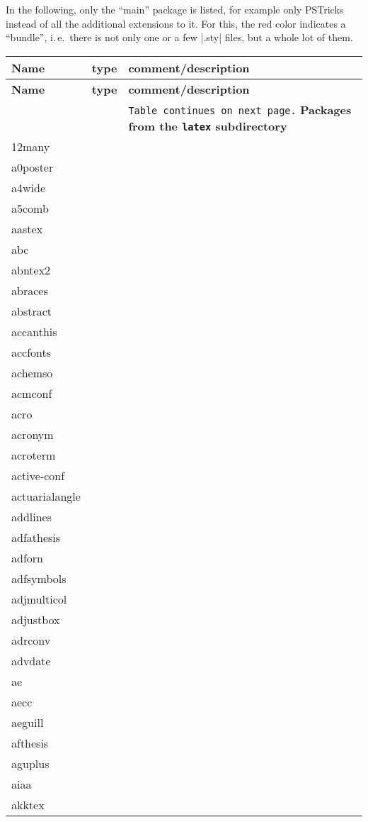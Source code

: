 In the following, only the “main” package is listed, for example only PSTricks instead of all the additional extensions to it. For this, the red color indicates a “bundle”, i.\,e.~there is not only one or a few |.sty| files, but a whole lot of them.

\def\bundle{\color{red}}
\small
\begin{longtabu} to \textwidth {llX}
\toprule
\bf Name & \bf type & \bf comment/description
\\ \midrule
\endhead
\bf Name & \bf type & \bf comment/description
\\ \midrule
\endfirsthead
\bottomrule
\small & & \texttt{Table continues on next page.}
\endfoot
\bottomrule
\endlastfoot
\bf Packages from the \texttt{latex} subdirectory\\
\midrule
12many	&	&	\\
a0poster	&	&	\\
a4wide	&	&	\\
a5comb	&	&	\\
aastex	&	&	\\
abc	&	&	\\
abntex2	&	&	\\
abraces	&	&	\\
abstract	&	&	\\
accanthis	&	&	\\
accfonts	&	&	\\
achemso	&	&	\\
acmconf	&	&	\\
acro	&	&	\\
acronym	&	&	\\
acroterm	&	&	\\
active-conf	&	&	\\
actuarialangle	&	&	\\
addlines	&	&	\\
adfathesis	&	&	\\
adforn	&	&	\\
adfsymbols	&	&	\\
adjmulticol	&	&	\\
adjustbox	&	&	\\
adrconv	&	&	\\
advdate	&	&	\\
ae	&	&	\\
aecc	&	&	\\
aeguill	&	&	\\
afthesis	&	&	\\
aguplus	&	&	\\
aiaa	&	&	\\
akktex	&	&	\\

\end{longtabu}
